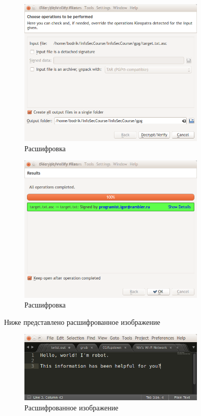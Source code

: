 \begin{figure}[H]
	\centering
	\includegraphics[width=0.8\textwidth]{images/16.png}
	\caption{Расшифровка}
\end{figure}

\begin{figure}[H]
	\centering
	\includegraphics[width=0.8\textwidth]{images/17.png}
	\caption{Расшифровка}
\end{figure}

Ниже представлено расшифрованное изображение

\begin{figure}[H]
	\centering
	\includegraphics[width=0.8\textwidth]{images/18.png}
	\caption{Расшифрованное изображение}
\end{figure}

